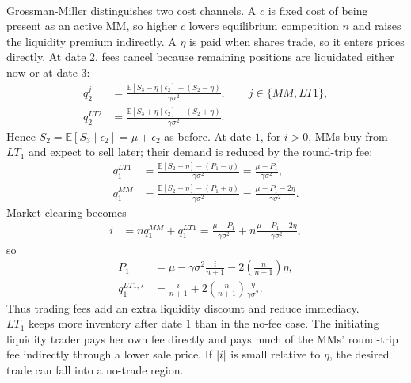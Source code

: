 \documentclass[a4paper,oneside,openany]{book}
\begin{document}
\begin{model}
\par\smallskip\noindent{}\\
Grossman-Miller distinguishes two cost channels. A  $c$ is fixed cost of being present as an active MM, so higher $c$ lowers equilibrium competition $n$ and raises the liquidity premium indirectly. A  $\eta$ is paid when shares trade, so it enters prices directly. At date $2$, fees cancel because remaining positions are liquidated either now or at date $3$:
\begin{align*}
q_2^j
&=\frac{\mathbb{E}[S_3-\eta\mid\epsilon_2]-(S_2-\eta)}{\gamma\sigma^2},
\qquad j\in\{MM,LT1\},\\
q_2^{LT2}
&=\frac{\mathbb{E}[S_3+\eta\mid\epsilon_2]-(S_2+\eta)}{\gamma\sigma^2}.
\end{align*}
Hence $S_2=\mathbb{E}[S_3\mid\epsilon_2]=\mu+\epsilon_2$ as before. At date $1$, for $i>0$, MMs buy from $LT_1$ and expect to sell later; their demand is reduced by the round-trip fee:
\begin{align*}
q_1^{LT1}
&=\frac{\mathbb{E}[S_2-\eta]-(P_1-\eta)}{\gamma\sigma^2}
=\frac{\mu-P_1}{\gamma\sigma^2},\\
q_1^{MM}
&=\frac{\mathbb{E}[S_2-\eta]-(P_1+\eta)}{\gamma\sigma^2}
=\frac{\mu-P_1-2\eta}{\gamma\sigma^2}.
\end{align*}
Market clearing becomes
\begin{align*}
i&=nq_1^{MM}+q_1^{LT1}
=\frac{\mu-P_1}{\gamma\sigma^2}
+n\frac{\mu-P_1-2\eta}{\gamma\sigma^2},
\end{align*}
so
\begin{align*}
P_1&=\mu-\gamma\sigma^2\frac{i}{n+1}-2\left(\frac{n}{n+1}\right)\eta,\\
q_1^{LT1,\star}
&=\frac{i}{n+1}+2\left(\frac{n}{n+1}\right)\frac{\eta}{\gamma\sigma^2}.
\end{align*}
Thus trading fees add an extra liquidity discount and reduce immediacy.\\
$LT_1$ keeps more inventory after date $1$ than in the no-fee case. The initiating liquidity trader pays her own fee directly and pays much of the MMs' round-trip fee indirectly through a lower sale price. If $\left\lvert i\right\rvert$ is small relative to $\eta$, the desired trade can fall into a no-trade region.


\end{model}
\end{document}
